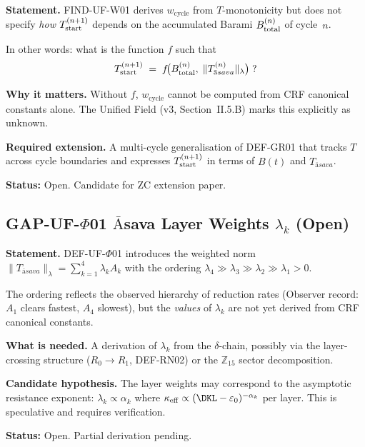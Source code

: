\documentclass[12pt, a4paper]{article}
\providecommand{\eps}{\varepsilon_0}
\providecommand{\Tasava}{T_{\bar{\mathrm{a}}sava}}
\providecommand{\wcyc}{w_{\mathrm{cycle}}}
\providecommand{\keff}{\kappa_{\mathrm{eff}}}
\providecommand{\Tasava}{\mathcal{T}_{\!\mathrm{\bar{a}sava}}}
\begin{document}
\begin{openqbox}[title={GAP-UF-W01: Formal
  $T$-Transfer Across Cycles (Open)}]
\textbf{Statement.}
FIND-UF-W01 derives $\wcyc$ from $T$-monotonicity but does not
specify \emph{how} $T^{(n+1)}_{\rm start}$ depends on the
accumulated Barami $B^{(n)}_{\rm total}$ of cycle~$n$.

In other words: what is the function $f$ such that
\[
  T^{(n+1)}_{\rm start} \;=\; f\!\bigl(B^{(n)}_{\rm total},\;
  \|\Tasava^{(n)}\|_\lambda\bigr) \;?
\]

\textbf{Why it matters.}
Without $f$, $\wcyc$ cannot be computed from CRF canonical
constants alone. The Unified Field (v3, Section~II.5.B) marks
this explicitly as unknown.

\textbf{Required extension.}
A multi-cycle generalisation of DEF-GR01 that tracks
$T$ across cycle boundaries and expresses
$T_{\rm start}^{(n+1)}$ in terms of $B(t)$ and $\Tasava$.

\textbf{Status:} Open. Candidate for ZC extension paper.
\end{openqbox}

\subsection{GAP-UF-\texorpdfstring{$\Phi$}{Phi}01 \quad
         \texorpdfstring{$\bar{\text{A}}$}{A}sava Layer Weights
         \texorpdfstring{$\lambda_k$}{lambda\_k} (Open)}


\begin{openqbox}[title={GAP-UF-$\Phi$01: Layer Weights
  $\lambda_k$ Unspecified (Open)}]
\textbf{Statement.}
DEF-UF-$\Phi$01 introduces the weighted norm
$\|\Tasava\|_\lambda = \sum_{k=1}^4 \lambda_k A_k$
with the ordering $\lambda_4 \gg \lambda_3 \gg \lambda_2
\gg \lambda_1 > 0$.

The ordering reflects the observed hierarchy of reduction
rates (Observer record: $A_1$ clears fastest, $A_4$ slowest),
but the \emph{values} of $\lambda_k$ are not yet derived from
CRF canonical constants.

\textbf{What is needed.}
A derivation of $\lambda_k$ from the $\delta$-chain, possibly
via the layer-crossing structure ($R_0 \to R_1$, DEF-RN02)
or the $\mathbb{Z}_{15}$ sector decomposition.

\textbf{Candidate hypothesis.}
The layer weights may correspond to the asymptotic resistance
exponent: $\lambda_k \propto \alpha_k$ where
$\keff \propto (\DKL - \eps)^{-\alpha_k}$ per layer.
This is speculative and requires verification.

\textbf{Status:} Open. Partial derivation pending.
\end{openqbox}
\end{document}
